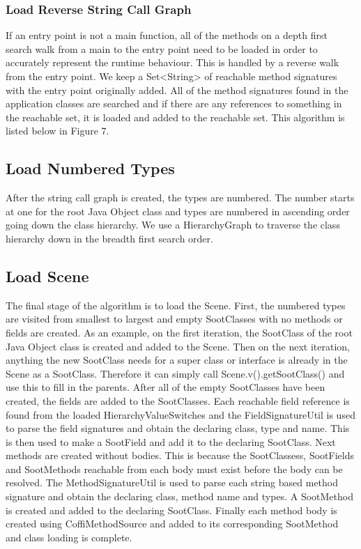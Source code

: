 \documentclass[preprint]{sigplanconf}
\begin{document}
\subsubsection{Load Reverse String Call Graph}
If an entry point is not a main function, all of the methods on a depth first search walk from a main to the entry point need to be loaded in order to accurately represent the runtime behaviour. This is handled by a reverse walk from the entry point. We keep a Set<String> of reachable method signatures with the entry point originally added. All of the method signatures found in the application classes are searched and if there are any references to something in the reachable set, it is loaded and added to the reachable set. This algorithm is listed below in Figure 7.

\subsection{Load Numbered Types}
After the string call graph is created, the types are numbered. The number starts at one for the root Java Object class and types are numbered in ascending order going down the class hierarchy. We use a HierarchyGraph to traverse the class hierarchy down in the breadth first search order.

\subsection{Load Scene}
The final stage of the algorithm is to load the Scene. First, the numbered types are visited from smallest to largest and empty SootClasses with no methods or fields are created. As an example, on the first iteration, the SootClass of the root Java Object class is created and added to the Scene. Then on the next iteration, anything the new SootClass needs for a super class or interface is already in the Scene as a SootClass. Therefore it can simply call Scene.v().getSootClass() and use this to fill in the parents.
After all of the empty SootClasses have been created, the fields are added to the SootClasses. Each reachable field reference is found from the loaded HierarchyValueSwitches and the FieldSignatureUtil is used to parse the field signatures and obtain the declaring class, type and name. This is then used to make a SootField and add it to the declaring SootClass. 
Next methods are created without bodies. This is because the SootClassess, SootFields and SootMethods reachable from each body must exist before the body can be resolved. The MethodSignatureUtil is used to parse each string based method signature and obtain the declaring class, method name and types. A SootMethod is created and added to the declaring SootClass.
Finally each method body is created using CoffiMethodSource and added to its corresponding SootMethod and class loading is complete.
\end{document}
